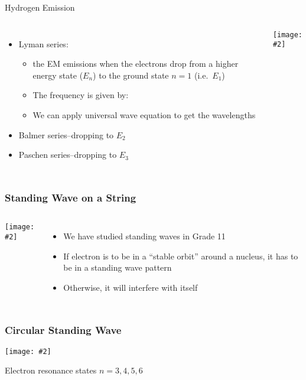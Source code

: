 \documentclass[12pt,compress,aspectratio=169]{beamer}
\newcommand{\pic}[2]{\texttt{[image: \#2]}}
\newcommand{\eq}[2]{\vspace{#1}{\Large\begin{displaymath}#2\end{displaymath}}}
\begin{document}
\begin{frame}{Hydrogen Emission}
  \begin{columns}

    \begin{itemize}
    \item Lyman series:
      \begin{itemize}
      \item the EM emissions when the electrons drop from a higher energy state
        ($E_n$) to the ground state $n=1$ (i.e.\ $E_1$)
      \item The frequency is given by:
        
        \eq{-.2in}{
          f=\frac{E_1-E_n}{h}
        }
      \item We can apply universal wave equation to get the wavelengths
      \end{itemize}
    \item Balmer series--dropping to $E_2$
    \item Paschen series--dropping to $E_3$
    \end{itemize}

    \pic{1}{400px-Hydrogen_transitions}
  \end{columns}
\end{frame}


\begin{frame}
  \frametitle{Standing Wave on a String}
  \begin{columns}
    \pic{1}{strhar}

    \begin{itemize}
    \item We have studied standing waves in Grade 11
    \item If electron is to be in a ``stable orbit'' around a nucleus, it has
      to be in a standing wave pattern
    \item Otherwise, it will interfere with itself
    \end{itemize}
  \end{columns}
\end{frame}


\begin{frame}
  \frametitle{Circular Standing Wave}
  \begin{center}
    \pic{.7}{oo1wp}
  \end{center}
  Electron resonance states $n=3,4,5,6$
\end{frame}
\end{document}
